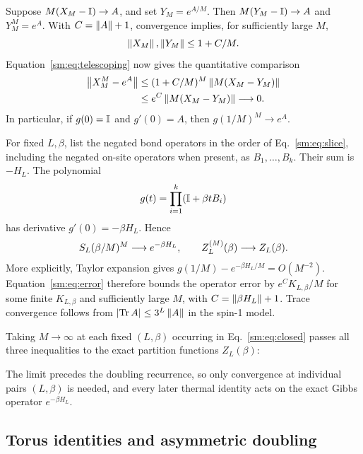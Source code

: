 Suppose $M(X_M-\mathbb I)\to A$, and set $Y_M=e^{A/M}$.
Then $M(Y_M-\mathbb I)\to A$ and $Y_M^M=e^A$.
With $C=\left\lVert A\right\rVert+1$, convergence implies, for sufficiently large
$M$,
\[
 \left\lVert X_M\right\rVert,\left\lVert Y_M\right\rVert\le1+C/M.
\]
Equation~\eqref{sm:eq:telescoping} now gives the quantitative comparison
\begin{align}
 \left\lVert X_M^M-e^A\right\rVert
 &\le (1+C/M)^M\left\lVert M(X_M-Y_M)\right\rVert \notag\\
 &\le e^C\left\lVert M(X_M-Y_M)\right\rVert\longrightarrow0.
 \label{sm:eq:error}
\end{align}
In particular, if $g(0)=\mathbb I$ and $g'(0)=A$, then
$g(1/M)^M\to e^A$.

For fixed $L,\beta$, list the negated bond operators in the order
of Eq.~\eqref{sm:eq:slice}, including the negated on-site operators
when present, as $B_1,\ldots,B_k$.
Their sum is $-H_L$. The polynomial
\[
 g(t)=\prod_{i=1}^k(\mathbb I+\beta tB_i)
\]
has derivative $g'(0)=-\beta H_L$. Hence
\begin{equation}
 S_L(\beta/M)^M\longrightarrow e^{-\beta H_L},
 \qquad Z_{L}^{(M)}(\beta)\longrightarrow Z_L(\beta).
 \label{sm:eq:limit}
\end{equation}
More explicitly, Taylor expansion gives
$g(1/M)-e^{-\beta H_L/M}=O(M^{-2})$.
Equation~\eqref{sm:eq:error} therefore bounds the operator error by
$e^C K_{L,\beta}/M$ for some finite $K_{L,\beta}$ and sufficiently
large $M$, with $C=\left\lVert \beta H_L\right\rVert+1$.
Trace convergence follows from
$\lvert\operatorname{Tr} A\rvert\le3^L\left\lVert A\right\rVert$ in the spin-1 model.

Taking $M\to\infty$ at each fixed $(L,\beta)$ occurring in
Eq.~\eqref{sm:eq:closed} passes all three inequalities to the exact
partition functions $Z_L(\beta)$:
\begin{proofdiagram}
 \limitfirst
\end{proofdiagram}
The limit precedes the doubling recurrence, so only convergence at
individual pairs $(L,\beta)$ is needed, and every later thermal identity
acts on the exact Gibbs operator $e^{-\beta H_L}$.

\subsection{Torus identities and asymmetric doubling}
\label{sm:sec:asymmetric}

